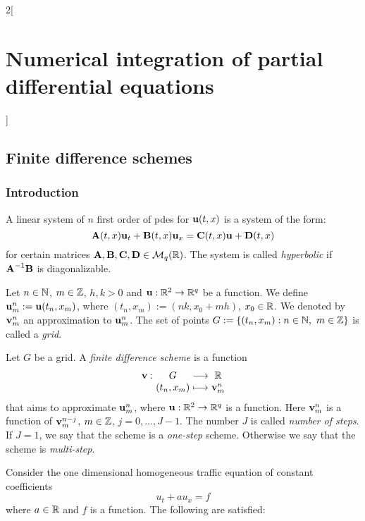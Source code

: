 \documentclass[../../../main_math.tex]{subfiles}
\begin{document}
\begin{multicols}{2}[\section{Numerical integration of partial differential equations}]
  \subsection{Finite difference schemes}
  \subsubsection{Introduction}
  \begin{definition}
    A linear system of $n$ first order of pdes for $\boldsymbol{\mathrm{u}}(t,x)$ is a system of the form: $$\boldsymbol{\mathrm{A}}(t,x)\boldsymbol{\mathrm{u}}_t+\boldsymbol{\mathrm{B}}(t,x)\boldsymbol{\mathrm{u}}_x=\boldsymbol{\mathrm{C}}(t,x)\boldsymbol{\mathrm{u}}+\boldsymbol{\mathrm{D}}(t,x)$$
    for certain matrices $\boldsymbol{\mathrm{A}},\boldsymbol{\mathrm{B}},\boldsymbol{\mathrm{C}}, \boldsymbol{\mathrm{D}}\in \mathcal{M}_q(\mathbb{R})$. The system is called \emph{hyperbolic} if $\boldsymbol{\mathrm{A}}^{-1}\boldsymbol{\mathrm{B}}$ is diagonalizable.
  \end{definition}
  \begin{definition}
    Let $n\in\mathbb{N}$, $m\in\mathbb{Z}$, $h,k>0$ and $\boldsymbol{\mathrm{u}}:\mathbb{R}^2\rightarrow\mathbb{R}^q$ be a function. We define $\boldsymbol{\mathrm{u}}_m^n:=\boldsymbol{\mathrm{u}}(t_n,x_m)$, where $(t_n, x_m):=(nk,x_0+mh)$, $x_0\in\mathbb{R}$. We denoted by $\boldsymbol{\mathrm{v}}_m^n$ an approximation to $\boldsymbol{\mathrm{u}}_m^n$. The set of points $G:=\{(t_n,x_m):n\in\mathbb{N},\ m\in\mathbb{Z}\}$ is called a \emph{grid}.
  \end{definition}
  \begin{definition}
    Let $G$ be a grid. A \emph{finite difference scheme} is a function $$\function{\vf{v}}{G}{\RR}{(t_n,x_m)}{\vf{v}_m^n}$$
    that aims to approximate $\boldsymbol{\mathrm{u}}_m^n$, where $\boldsymbol{\mathrm{u}}:\mathbb{R}^2\rightarrow\mathbb{R}^q$ is a function. Here $\boldsymbol{\mathrm{v}}_m^n$ is a function of $\boldsymbol{\mathrm{v}}_m^{n-j}$, $m\in\mathbb{Z}$, $j=0,\ldots,J-1$. The number $J$ is called \emph{number of steps}. If $J=1$, we say that the scheme is a \emph{one-step} scheme. Otherwise we say that the scheme is \emph{multi-step}.
  \end{definition}
  \begin{proposition}
    Consider the one dimensional homogeneous traffic equation of constant coefficients
    \begin{equation}\label{NIPDE:traffic}
      u_t+au_x=f
    \end{equation}
    where $a\in\mathbb{R}$ and $f$ is a function.
    The following are satisfied:
    \begin{enumerate}

\end{enumerate}
\end{proposition}
\end{multicols}
\end{document}
